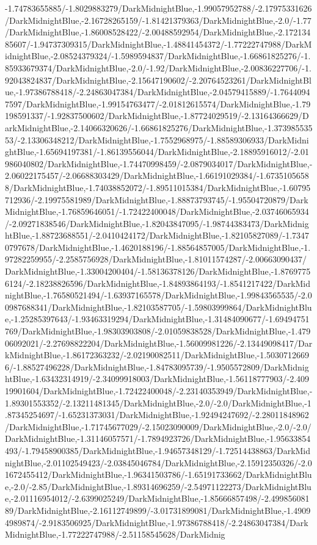 {\begin{tikzternal}
{-1.74783655885/-1.8029883279/DarkMidnightBlue,-1.99057952788/-2.17975331626/DarkMidnightBlue,-2.16728265159/-1.81421379363/DarkMidnightBlue,-2.0/-1.77/DarkMidnightBlue,-1.86008528422/-2.00488592954/DarkMidnightBlue,-2.17213485607/-1.94737309315/DarkMidnightBlue,-1.48841454372/-1.77222747988/DarkMidnightBlue,-2.08524379324/-1.5989594837/DarkMidnightBlue,-1.66861825276/-1.85933679374/DarkMidnightBlue,-2.0/-1.92/DarkMidnightBlue,-2.00836227706/-1.92043824837/DarkMidnightBlue,-2.15647190602/-2.20764523261/DarkMidnightBlue,-1.97386788418/-2.24863047384/DarkMidnightBlue,-2.04579415889/-1.76440947597/DarkMidnightBlue,-1.99154763477/-2.01812615574/DarkMidnightBlue,-1.79198591337/-1.92837500602/DarkMidnightBlue,-1.87724029519/-2.13164366629/DarkMidnightBlue,-2.14066320626/-1.66861825276/DarkMidnightBlue,-1.37398553553/-2.13306348212/DarkMidnightBlue,-1.7552968975/-1.88589306933/DarkMidnightBlue,-1.65694197381/-1.86139556044/DarkMidnightBlue,-2.18895916012/-2.01986040802/DarkMidnightBlue,-1.74470998459/-2.0879034017/DarkMidnightBlue,-2.06022175457/-2.06688303429/DarkMidnightBlue,-1.66191029384/-1.67351056588/DarkMidnightBlue,-1.74038852072/-1.89511015384/DarkMidnightBlue,-1.60795712936/-2.19975581989/DarkMidnightBlue,-1.88873793745/-1.95504720879/DarkMidnightBlue,-1.76859646051/-1.72422400048/DarkMidnightBlue,-2.03746065934/-2.09271838546/DarkMidnightBlue,-1.82043847095/-1.98744383473/DarkMidnightBlue,-1.88723688551/-2.0410424172/DarkMidnightBlue,-1.82105827089/-1.73470797678/DarkMidnightBlue,-1.4620188196/-1.88564857005/DarkMidnightBlue,-1.97282259955/-2.2585756928/DarkMidnightBlue,-1.81011574287/-2.00663090437/DarkMidnightBlue,-1.33004200404/-1.58136378126/DarkMidnightBlue,-1.87697756124/-2.18238826596/DarkMidnightBlue,-1.84893864193/-1.8541217422/DarkMidnightBlue,-1.76580521494/-1.63937165578/DarkMidnightBlue,-1.99843565535/-2.00987688341/DarkMidnightBlue,-1.82103587705/-1.59803999864/DarkMidnightBlue,-1.25285397643/-1.93463319294/DarkMidnightBlue,-1.31484090677/-1.69494751769/DarkMidnightBlue,-1.98303903808/-2.01059838528/DarkMidnightBlue,-1.47906092021/-2.27698822204/DarkMidnightBlue,-1.56009981226/-2.13449098417/DarkMidnightBlue,-1.86172363232/-2.02190082511/DarkMidnightBlue,-1.50307126696/-1.88527496228/DarkMidnightBlue,-1.84783095739/-1.9505572809/DarkMidnightBlue,-1.63432314919/-2.34099918003/DarkMidnightBlue,-1.56118777903/-2.40919901604/DarkMidnightBlue,-1.72422400048/-2.23140353949/DarkMidnightBlue,-1.89301553352/-2.13211481345/DarkMidnightBlue,-2.0/-2.0/DarkMidnightBlue,-1.87345254697/-1.65231373031/DarkMidnightBlue,-1.92494247692/-2.28011848962/DarkMidnightBlue,-1.71745677029/-2.15023090009/DarkMidnightBlue,-2.0/-2.0/DarkMidnightBlue,-1.31146057571/-1.7894923726/DarkMidnightBlue,-1.95633854493/-1.79458900385/DarkMidnightBlue,-1.94657348129/-1.72514438863/DarkMidnightBlue,-2.01102549423/-2.03845046784/DarkMidnightBlue,-2.15912350326/-2.01672455412/DarkMidnightBlue,-1.96341503786/-1.65191733662/DarkMidnightBlue,-2.0/-2.85/DarkMidnightBlue,-1.89314696259/-2.54971122273/DarkMidnightBlue,-2.01116954012/-2.6399025249/DarkMidnightBlue,-1.85666857498/-2.49985608189/DarkMidnightBlue,-2.16112749899/-3.01731899081/DarkMidnightBlue,-1.49094989874/-2.9183506925/DarkMidnightBlue,-1.97386788418/-2.24863047384/DarkMidnightBlue,-1.77222747988/-2.51158545628/DarkMidnig}
\end{tikzternal}}

